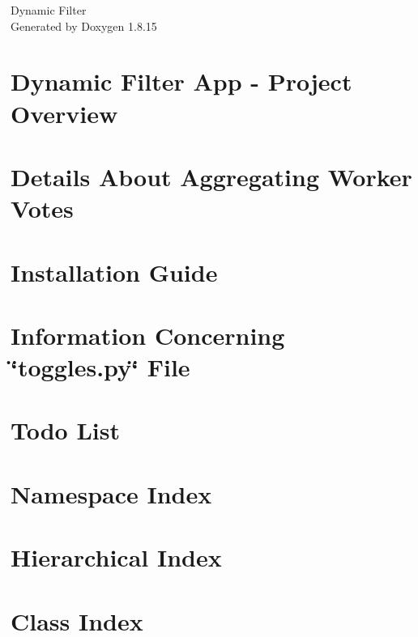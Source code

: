 \let\mypdfximage\pdfximage\def\pdfximage{\immediate\mypdfximage}\documentclass[twoside]{book}
\newcommand{\+}{\discretionary{\mbox{\scriptsize$\hookleftarrow$}}{}{}}
\newcommand{\clearemptydoublepage}{%
  \newpage{\pagestyle{empty}\cleardoublepage}%
}
\begin{document}
\hypersetup{pageanchor=false,
             bookmarksnumbered=true,
             pdfencoding=unicode
            }
\begin{titlepage}
\vspace*{7cm}
\begin{center}%
{\Large Dynamic Filter }\\
\vspace*{1cm}
{\large Generated by Doxygen 1.8.15}\\
\end{center}
\end{titlepage}
\clearemptydoublepage
{}
\tableofcontents
\clearemptydoublepage
{}
\hypersetup{pageanchor=true}

\chapter{Dynamic Filter App -\/ Project Overview}
\label{index}\hypertarget{index}{}
\chapter{Details About Aggregating Worker Votes}
\label{con_info}

\chapter{Installation Guide}
\label{install_info}

\chapter{Information Concerning \char`\"{}toggles.\+py\char`\"{} File}
\label{toggles}

\chapter{Todo List}
\label{todo}

\chapter{Namespace Index}

\chapter{Hierarchical Index}

\chapter{Class Index}

\end{document}
